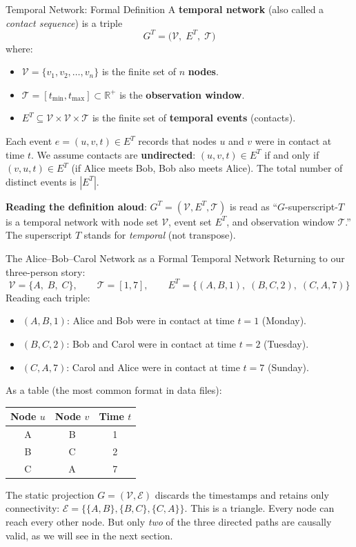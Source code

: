 \begin{conceptbox}{Temporal Network: Formal Definition}
A \textbf{temporal network} (also called a \emph{contact sequence}) is a triple
\[
  G^T = \bigl(\mathcal{V},\; E^T,\; \mathcal{T}\bigr)
\]
where:
\begin{itemize}[noitemsep]
  \item $\mathcal{V} = \{v_1, v_2, \ldots, v_n\}$ is the finite set of $n$ \textbf{nodes}.
  \item $\mathcal{T} = [t_{\min}, t_{\max}] \subset \mathbb{R}^+$ is the
        \textbf{observation window}.
  \item $E^T \subseteq \mathcal{V} \times \mathcal{V} \times \mathcal{T}$ is the
        finite set of \textbf{temporal events} (contacts).
\end{itemize}
Each event $e = (u, v, t) \in E^T$ records that nodes $u$ and $v$ were in contact at time $t$.
We assume contacts are \textbf{undirected}: $(u, v, t) \in E^T$ if and only if
$(v, u, t) \in E^T$ (if Alice meets Bob, Bob also meets Alice). The total number of distinct
events is $|E^T|$.
\end{conceptbox}

\textbf{Reading the definition aloud}: $G^T = (\mathcal{V}, E^T, \mathcal{T})$ is read as
``$G$-superscript-$T$ is a temporal network with node set $\mathcal{V}$, event set $E^T$, and
observation window $\mathcal{T}$.'' The superscript $T$ stands for \emph{temporal} (not
transpose).

\begin{examplebox}{The Alice--Bob--Carol Network as a Formal Temporal Network}
Returning to our three-person story:
\[
  \mathcal{V} = \{A,\; B,\; C\}, \qquad
  \mathcal{T} = [1, 7], \qquad
  E^T = \{(A,B,1),\; (B,C,2),\; (C,A,7)\}
\]
Reading each triple:
\begin{itemize}[noitemsep]
  \item $(A, B, 1)$: Alice and Bob were in contact at time $t = 1$ (Monday).
  \item $(B, C, 2)$: Bob and Carol were in contact at time $t = 2$ (Tuesday).
  \item $(C, A, 7)$: Carol and Alice were in contact at time $t = 7$ (Sunday).
\end{itemize}

As a table (the most common format in data files):
\begin{center}
\begin{tabular}{ccc}
\toprule
\textbf{Node $u$} & \textbf{Node $v$} & \textbf{Time $t$} \\
\midrule
A & B & 1 \\
B & C & 2 \\
C & A & 7 \\
\bottomrule
\end{tabular}
\end{center}

The static projection $G = (\mathcal{V}, \mathcal{E})$ discards the timestamps and retains
only connectivity:
$\mathcal{E} = \{\{A,B\}, \{B,C\}, \{C,A\}\}$.
This is a triangle. Every node can reach every other node. But only \textit{two} of the three
directed paths are causally valid, as we will see in the next section.
\end{examplebox}

